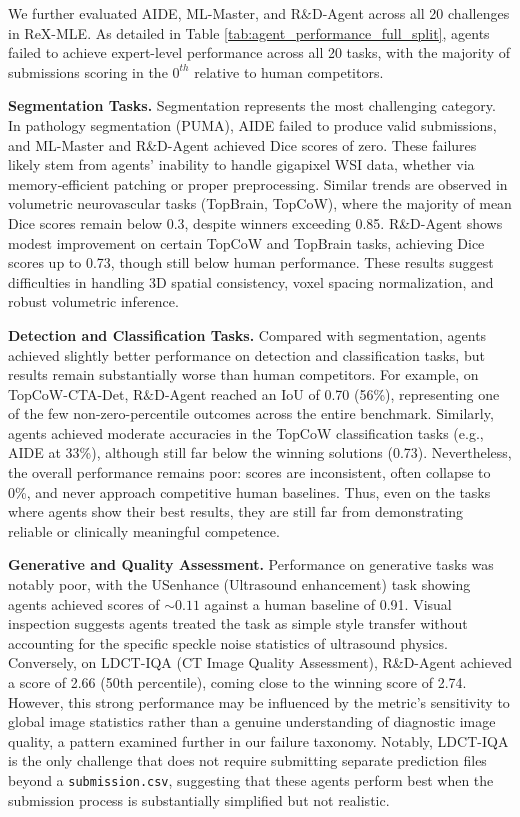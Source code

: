 \documentclass{midl} %
\begin{document}
We further evaluated AIDE, ML-Master, and R$\&$D-Agent across all 20 challenges in ReX-MLE.
As detailed in Table \ref{tab:agent_performance_full_split}, agents failed to achieve expert-level performance across all 20 tasks, with the majority of submissions scoring in the $0^{th}$ relative to human competitors.

\vspace{3pt} \noindent \textbf{Segmentation Tasks.} Segmentation represents the most challenging category. In pathology segmentation (PUMA), AIDE failed to produce valid submissions, and ML-Master and R\&D-Agent achieved Dice scores of zero. These failures likely stem from agents’ inability to handle gigapixel WSI data, whether via memory‑efficient patching or proper preprocessing. Similar trends are observed in volumetric neurovascular tasks (TopBrain, TopCoW), where the majority of mean Dice scores remain below 0.3, despite winners exceeding 0.85. R\&D-Agent shows modest improvement on certain TopCoW and TopBrain tasks, achieving Dice scores up to 0.73, though still below human performance. These results suggest difficulties in handling 3D spatial consistency, voxel spacing normalization, and robust volumetric inference.

\vspace{3pt} \noindent \textbf{Detection and Classification Tasks.} Compared with segmentation, agents achieved slightly better performance on detection and classification tasks, but results remain substantially worse than human competitors. For example, on TopCoW-CTA-Det, R$\&$D-Agent reached an IoU of 0.70 (56\%), representing one of the few non-zero-percentile outcomes across the entire benchmark. Similarly, agents achieved moderate accuracies in the TopCoW classification tasks (e.g., AIDE at 33\%), although still far below the winning solutions (0.73). Nevertheless, the overall performance remains poor: scores are inconsistent, often collapse to 0\%, and never approach competitive human baselines. Thus, even on the tasks where agents show their best results, they are still far from demonstrating reliable or clinically meaningful competence.

\vspace{3pt} \noindent \textbf{Generative and Quality Assessment.} Performance on generative tasks was notably poor, with the USenhance (Ultrasound enhancement) task showing agents achieved scores of $\sim0.11$ against a human baseline of 0.91. Visual inspection suggests agents treated the task as simple style transfer without accounting for the specific speckle noise statistics of ultrasound physics. Conversely, on LDCT-IQA (CT Image Quality Assessment), R\&D-Agent achieved a score of 2.66 (50th percentile), coming close to the winning score of 2.74. However, this strong performance may be influenced by the metric’s sensitivity to global image statistics rather than a genuine understanding of diagnostic image quality, a pattern examined further in our failure taxonomy. Notably, LDCT-IQA is the only challenge that does not require submitting separate prediction files beyond a \texttt{submission.csv}, suggesting that these agents perform best when the submission process is substantially simplified but not realistic.
\end{document}
